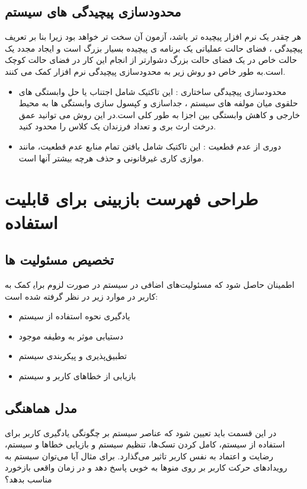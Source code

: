 \subsection{محدودسازی پیچیدگی های سیستم}
هر چقدر یک نرم افزار پیچیده تر باشد، آزمون آن سخت تر خواهد بود زیرا بنا بر تعریف پیچیدگی ، فضای حالت عملیاتی یک برنامه ی پیچیده بسیار بزرگ است و ایجاد مجدد یک حالت خاص در یک فضای حالت بزرگ دشوارتر از انجام این کار در فضای حالت کوچک است.به طور خاص دو روش زیر به محدودسازی پیچیدگی نرم افزار کمک می کنند.
\begin{itemize}
\item
محدود‌سازی پیچیدگی ساختاری :
این تاکتیک شامل اجتناب یا حل وابستگی های حلقوی میان مولفه های سیستم ، جداسازی و کپسول سازی وابستگی ها به محیط خارجی و کاهش وابستگی بین اجزا به طور کلی است.در این روش می توانید عمق درخت ارث بری  و تعداد فرزندان یک کلاس را محدود کنید.
\item
دوری از عدم قطعیت  :
این تاکتیک شامل یافتن تمام منابع عدم قطعیت، مانند موازی کاری غیرقانونی و حذف هرچه بیشتر آنها است.
\end{itemize}
\section{طراحی فهرست بازبینی برای قابلیت استفاده}
\subsection{تخصیص مسئولیت ها} 

اطمینان حاصل شود که مسئولیت‌های اضافی در سیستم در صورت لزوم برای‍ کمک به کاربر در موارد زیر در نظر گرفته شده است:
\begin{itemize}
\item
یادگیری نحوه استفاده از سیستم 
\item
دستیابی موثر به وطیفه موجود 
\item
تطبیق‌پذیری و پیکربندی سیستم
\item
بازیابی از خطاهای کاربر و سیستم
\end{itemize}

\subsection{مدل هماهنگی}

در این قسمت باید تعیین شود که عناصر سیستم بر چگونگی یادگیری کاربر برای استفاده از سیستم، کامل کردن تسک‌ها، تنظیم سیستم و بازیابی خطاها و سیستم، رضایت و اعتماد به نفس کاربر تاثیر می‌گذارد.
برای مثال آیا می‌توان سیستم به رویدادهای حرکت کاربر بر روی منوها به خوبی پاسخ دهد و در زمان واقعی بازخورد مناسب بدهد؟
